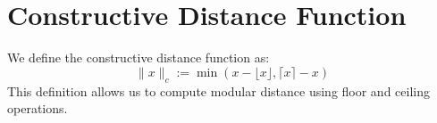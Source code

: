 
\section{Constructive Distance Function}
We define the constructive distance function as:
\[
\|x\|_c := \min(x - \lfloor x \rfloor, \lceil x \rceil - x)
\]
This definition allows us to compute modular distance using floor and ceiling operations.
